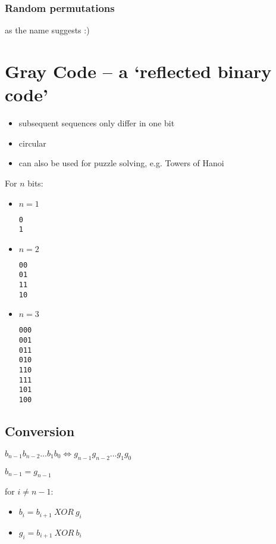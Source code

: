 \documentclass[11pt]{article}
\begin{document}
\subsubsection{Random permutations}

as the name suggests :)

\section{Gray Code – a `reflected binary code'}

\begin{itemize}
\item subsequent sequences only differ in one bit
\item circular
\item can also be used for puzzle solving, e.g. Towers of Hanoi
\end{itemize}

For $ n $ bits:
\begin{itemize}

\item $ n = 1 $
	\begin{lstlisting}
0
1
	\end{lstlisting}

\item $ n = 2 $
	\begin{lstlisting}
00
01
11
10
	\end{lstlisting}

\item $ n = 3 $
	\begin{lstlisting}
000
001
011
010
110
111
101
100
	\end{lstlisting}

\end{itemize}

\subsection{Conversion}

$ b_{n - 1} b_{n - 2} \dots b_{1} b_0 \Longleftrightarrow g_{n - 1} g_{n - 2} \dots g_{1} g_0 $

$ b_{n - 1} = g_{n - 1} $ \newline

for $ i \neq n - 1 $:
\begin{itemize}
\item $ b_i = b_{i + 1} ~ XOR ~g_{i} $
\item $ g_i = b_{i + 1} ~ XOR ~ b_{i} $
\end{itemize}
\end{document}
